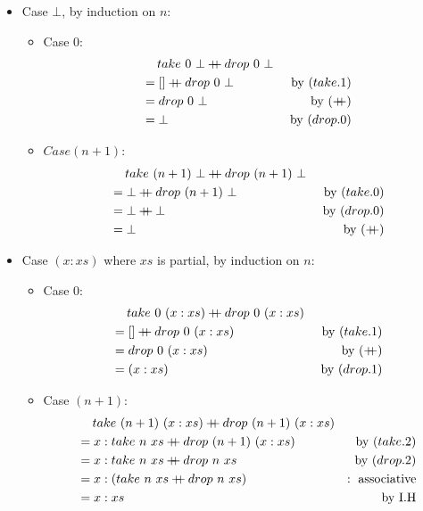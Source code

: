 \documentclass{article}[10pt]
\newcommand\concat{\ensuremath{\mathbin{+\mkern-8mu+}}}
\begin{document}
    \begin{itemize}
      \item Case $\bot$, by induction on $n$:
      \begin{itemize}
        \item Case $0$:
        \begin{align*}
          &\mathbin{\hphantom{=}}take\ 0\ \bot \concat drop\ 0\ \bot\\
          &=                                [] \concat drop\ 0\ \bot &\text{ by }(take.1)\\
          &=                                           drop\ 0\ \bot &\text{ by }(\concat)\\
          &=                                           \bot          &\text{ by }(drop.0)
        \end{align*}
        \item $Case (n+1)$:
        \begin{align*}
          &\mathbin{\hphantom{=}}take\ (n+1)\ \bot \concat drop\ (n+1)\ \bot\\
          &= \bot                                  \concat drop\ (n+1)\ \bot &\text{ by }(take.0)\\
          &= \bot                                  \concat \bot              &\text{ by }(drop.0)\\
          &= \bot                                                            &\text{ by }(\concat)
        \end{align*}
      \end{itemize}
      \item Case $(x:xs)$ where $xs$ is partial, by induction on $n$:
      \begin{itemize}
        \item Case $0$:
        \begin{align*}
          &\mathbin{\hphantom{=}}take\ 0\ (x:xs) \concat drop\ 0\ (x:xs)\\
          &=                     []              \concat drop\ 0\ (x:xs) &\text{ by }(take.1)\\
          &=                                             drop\ 0\ (x:xs) &\text{ by }(\concat)\\
          &=                                             (x:xs)          &\text{ by }(drop.1)
        \end{align*}
        \item Case $(n+1)$:
        \begin{align*}
          &\mathbin{\hphantom{=}}take\ (n+1)\ (x:xs) \concat drop\ (n+1)\ (x:xs)\\
          &= x : take\ n\ xs \concat drop\ (n+1)\ (x:xs) &\text{by }(take.2)\\
          &= x : take\ n\ xs \concat drop\ n\ xs         &\text{by }(drop.2)\\
          &= x : (take\ n\ xs \concat drop\ n\ xs)     &: \text{ associative}\\
          &= x : xs                                    &\text{by I.H}
        \end{align*}
      \end{itemize}
    \end{itemize}
\end{document}
